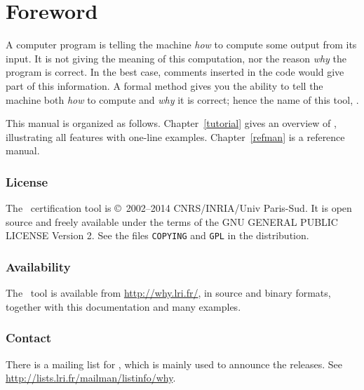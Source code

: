 \documentclass[a4paper,12pt]{report}
\begin{document}


\tableofcontents

\chapter*{Foreword}

A computer program is telling the machine \emph{how} to compute some
output from its input. It is not giving the meaning of this
computation, nor the reason \emph{why} the program is correct. In the
best case, comments inserted in the code would give part of this
information. A formal method gives you the ability to tell the
machine both \emph{how} to compute and \emph{why} it is correct; hence
the name of this tool, \why.


\medskip

This manual is organized as follows. Chapter~\ref{tutorial} gives an
overview of \why, illustrating all features with one-line examples.
Chapter~\ref{refman} is a reference manual.


\subsection*{License}

The \why\ certification tool is \copyright\ 2002--2014 CNRS/INRIA/Univ
Paris-Sud. It is open source and freely available under the terms of the GNU
GENERAL PUBLIC LICENSE Version 2. See the files \texttt{COPYING} and
\texttt{GPL} in the distribution.


\subsection*{Availability}

The \why\ tool is available from \url{http://why.lri.fr/}, in source
and binary formats, together with this documentation and many
examples.


\subsection*{Contact}

There is a mailing list for \why, which is mainly used to announce the
releases. See \url{http://lists.lri.fr/mailman/listinfo/why}.
\end{document}
